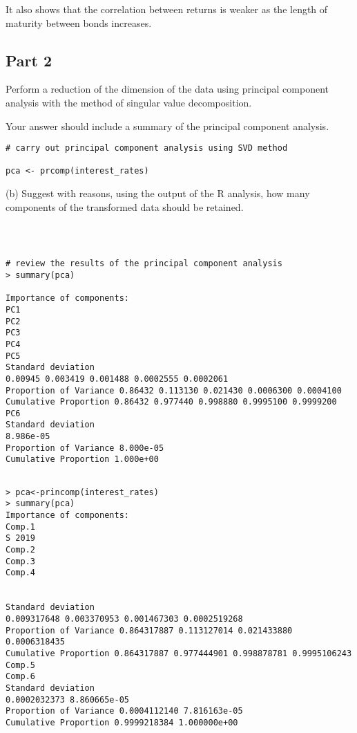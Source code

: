 \documentclass[a4paper,12pt]{article}
\begin{document}
It also shows that the correlation between returns is weaker as the length of maturity between bonds increases.
\newpage 
\subsection*{Part 2}
\noindent Perform a reduction of the dimension of the data using principal component analysis with the method of singular value decomposition.

\noindent Your answer should include a summary of the principal component analysis.
\begin{framed} 
\begin{verbatim}
# carry out principal component analysis using SVD method

pca <- prcomp(interest_rates)
\end{verbatim} \end{framed}

\newpage
(b) Suggest with reasons, using the output of the R analysis, how many components of the transformed data should be retained.






\begin{framed} \begin{verbatim}



# review the results of the principal component analysis
> summary(pca)

Importance of components:
PC1
PC2
PC3
PC4
PC5
Standard deviation
0.00945 0.003419 0.001488 0.0002555 0.0002061
Proportion of Variance 0.86432 0.113130 0.021430 0.0006300 0.0004100
Cumulative Proportion 0.86432 0.977440 0.998880 0.9995100 0.9999200
PC6
Standard deviation
8.986e-05
Proportion of Variance 8.000e-05
Cumulative Proportion 1.000e+00
\end{verbatim}
\end{framed}

\newpage 

\begin{framed}
\begin{verbatim}

> pca<-princomp(interest_rates)
> summary(pca)
Importance of components:
Comp.1
S 2019
Comp.2
Comp.3
Comp.4


Standard deviation
0.009317648 0.003370953 0.001467303 0.0002519268
Proportion of Variance 0.864317887 0.113127014 0.021433880 0.0006318435
Cumulative Proportion 0.864317887 0.977444901 0.998878781 0.9995106243
Comp.5
Comp.6
Standard deviation
0.0002032373 8.860665e-05
Proportion of Variance 0.0004112140 7.816163e-05
Cumulative Proportion 0.9999218384 1.000000e+00


\end{verbatim} \end{framed}
\end{document}

